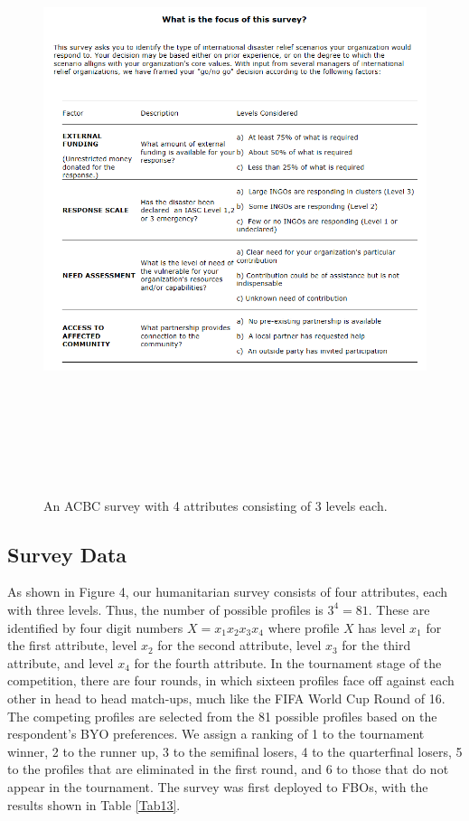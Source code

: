 \documentclass[a4paper, 12pt]{article}
\begin{document}
{\begin{figure}[!htpb]
\centering
\includegraphics[width=5.75in, height=7in]{AttributeLevels.png}
\caption{{\small An ACBC survey with 4 attributes consisting of 3 levels each. }}
\label{AL}
\end{figure}


\subsection{Survey Data}

As shown in Figure 4, our humanitarian survey consists of four attributes, each with three levels. Thus, the number of possible profiles is $3^4=81$. These are identified by four digit numbers $X=x_1x_2x_3x_4$ where profile $X$ has level $x_1$ for the first attribute, level $x_2$ for the second attribute, level $x_3$ for the third attribute, and level $x_4$ for the fourth attribute. In the tournament stage of the competition, there are four rounds, in which sixteen profiles face off against each other in head to head match-ups, much like the FIFA World Cup Round of 16. The competing profiles are selected from the 81 possible profiles based on the respondent's BYO preferences. We assign a ranking of 1 to the tournament winner, 2 to the runner up, 3 to the semifinal losers, 4 to the quarterfinal losers, 5 to the profiles that are eliminated in the first round, and 6 to those that do not appear in the tournament. The survey was first deployed to FBOs, with the results shown in Table \ref{Tab13}. 



}
\end{document}
